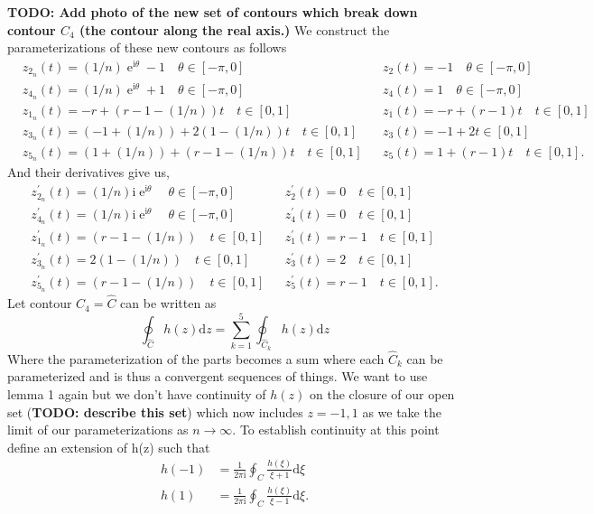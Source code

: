 \documentclass[10pt]{amsart}
\newcommand{\D}{\mathrm{d}}
\newcommand{\I}{\mathrm{i}}
\DeclareMathOperator{\E}{e}
\theoremstyle{nonumberplain}
\begin{document}
\begin{enumerate}[label={\bf {\arabic*}:}]
\begin{itemize}
\noindent
\textbf{TODO: Add photo of the new set of contours which break down contour $C_4$ (the contour along the real axis.)}
We construct the parameterizations of these new contours as follows
\begin{align*}
&z_{2_n}(t) = (1/n) \E^{\I \theta} - 1 \quad \theta \in [-\pi, 0]& &z_2(t) = -1 \quad \theta \in [-\pi, 0]& \\
&z_{4_n}(t) = (1/n) \E^{\I \theta} + 1 \quad \theta \in [-\pi, 0]& &z_4(t) = 1 \quad \theta \in [-\pi, 0]& \\
&z_{1_n}(t) = - r + (r - 1 - (1/n)) t \quad t \in [0, 1]& &z_1(t) = - r + (r - 1) t \quad t \in [0, 1]& \\
&z_{3_n}(t) = (- 1 + (1/n)) + 2(1 - (1/n))t \quad t \in [0, 1]& &z_3(t) = -1 + 2t \in [0, 1]& \\
&z_{5_n}(t) = (1 + (1/n)) + (r - 1 - (1/n))t \quad t \in [0, 1]& &z_5(t) = 1 + (r - 1)t \quad t \in [0, 1].&
\end{align*}
And their derivatives give us,
\begin{align*}
&z_{2_n}^\prime(t) = (1/n) \I \E^{\I \theta} \quad \theta \in [-\pi, 0]& &z_2^\prime(t) = 0 \quad t \in [0, 1]& \\
&z_{4_n}^\prime(t) = (1/n) \I \E^{\I \theta} \quad \theta \in [-\pi, 0]& &z_4^\prime(t) = 0 \quad t \in [0, 1]& \\
&z_{1_n}^\prime(t) = (r - 1 - (1/n)) \quad t \in [0, 1]& &z_1^\prime(t) = r - 1 \quad t \in [0, 1]& \\
&z_{3_n}^\prime(t) = 2(1 - (1/n)) \quad t \in [0, 1]& &z_3^\prime(t) = 2 \quad t \in [0, 1]& \\
&z_{5_n}^\prime(t) = (r - 1 - (1/n)) \quad t \in [0, 1]& &z_5^\prime(t) = r - 1 \quad t \in [0, 1].&
\end{align*}
Let contour $C_4 = \widehat C$ can be written as
$$
\oint_{\widehat C} h(z) \D z = \sum_{k = 1}^5 \oint_{\widehat C_k} h(z) \D z
$$
Where the parameterization of the parts becomes a sum where each $\widehat C_k$ can be parameterized and is thus a convergent sequences of things.
We want to use lemma 1 again but we don't have continuity of $h(z)$ on the closure of our open set (\textbf{TODO: describe this set}) which now includes $z=-1,1$ as we take the limit of our parameterizations as $n\rightarrow \infty$.
To establish continuity at this point define an extension of h(z) such that
\begin{align*}
h(-1) &= \frac 1 {2\pi \I}\oint_C \frac {h(\xi)}{\xi + 1} \D \xi \\
h(1) &= \frac 1 {2\pi \I}\oint_C \frac {h(\xi)}{\xi - 1} \D \xi.

\end{align*}
\end{itemize}
\end{enumerate}
\end{document}
